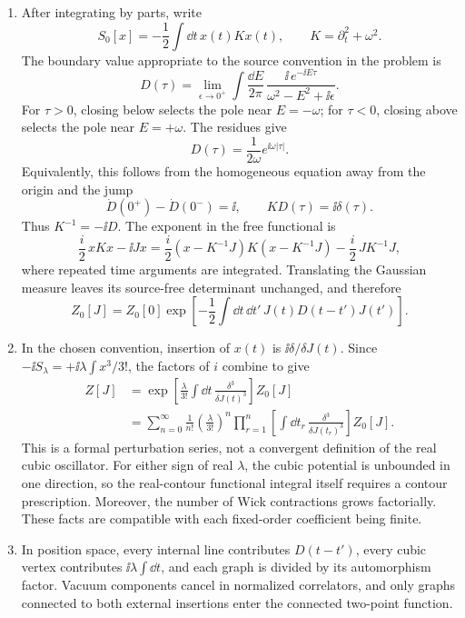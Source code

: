\begin{enumerate}
\begin{enumerate}
\item
After integrating by parts, write
\[
 S_0[x]=-\frac12\int \dd t\,x(t)Kx(t),
 \qquad K=\partial_t^2+\omega^2.
\]
The boundary value appropriate to the source convention in the problem is
\[
 D(\tau)=\lim_{\epsilon\to0^+}\int\frac{\dd E}{2\pi}\,
 \frac{\ii\,e^{-\ii E\tau}}{\omega^2-E^2+\ii\epsilon}.
\]
For \(\tau>0\), closing below selects the pole near \(E=-\omega\); for
\(\tau<0\), closing above selects the pole near \(E=+\omega\).  The
residues give
\[
 D(\tau)=\frac{1}{2\omega}e^{\ii\omega|\tau|}.
\]
Equivalently, this follows from the homogeneous equation away from the
origin and the jump
\[
 \dot D(0^+)-\dot D(0^-)=\ii,
 \qquad KD(\tau)=\ii\delta(\tau).
\]
Thus \(K^{-1}=-\ii D\).  The exponent in the free functional is
\[
 \frac i2\,xKx-\ii Jx
 =\frac i2(x-K^{-1}J)K(x-K^{-1}J)
 -\frac i2\,JK^{-1}J,
\]
where repeated time arguments are integrated.  Translating the Gaussian
measure leaves its source-free determinant unchanged, and therefore
\[
 \boxed{\;
 Z_0[J]=Z_0[0]\exp\left[-\frac12\int \dd t\,\dd t'\,
 J(t)D(t-t')J(t')\right].
 \;}
\]
\item
In the chosen convention, insertion of \(x(t)\) is
\(\ii\delta/\delta J(t)\).  Since
\(-\ii S_\lambda=+\ii\lambda\int x^3/3!\), the factors of \(i\) combine to give
\[
\begin{split}
 Z[J]
 &=\exp\left[
 \frac{\lambda}{3!}\int \dd t\,
 \frac{\delta^3}{\delta J(t)^3}\right]Z_0[J]\\
 &=\sum_{n=0}^{\infty}\frac1{n!}
 \left(\frac{\lambda}{3!}\right)^n
 \prod_{r=1}^{n}\left[
 \int \dd t_r\,\frac{\delta^3}{\delta J(t_r)^3}\right]Z_0[J].
\end{split}
\]
This is a formal perturbation series, not a convergent definition of the
real cubic oscillator.  For either sign of real \(\lambda\), the cubic
potential is unbounded in one direction, so the real-contour functional
integral itself requires a contour prescription.  Moreover, the number of
Wick contractions grows factorially.  These facts are compatible with each
fixed-order coefficient being finite.
\item
In position space, every internal line contributes \(D(t-t')\), every
cubic vertex contributes \(\ii\lambda\int \dd t\), and each graph is divided by
its automorphism factor.  Vacuum components cancel in normalized
correlators, and only graphs connected to both external insertions enter
the connected two-point function.


\end{enumerate}
\end{enumerate}
